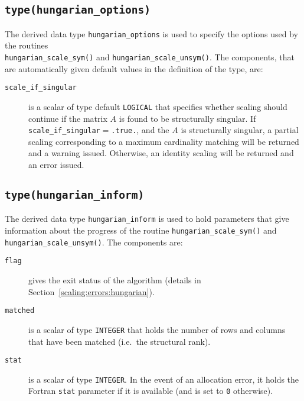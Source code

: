 \subsection{\texttt{type(hungarian\_options)}} \label{scaling:type:hungarian_options}

The derived data type \texttt{hungarian\_options} is used to specify the
options used by the routines \\\texttt{hungarian\_scale\_sym()} and \texttt{hungarian\_scale\_unsym()}. The components,
that are automatically given default values in the definition of the type, are:

\begin{description}

\item[\texttt{scale\_if\_singular}] is a scalar of type default \texttt{LOGICAL}
that specifies whether scaling should continue if the matrix $A$ is found to be
structurally singular. If \texttt{scale\_if\_singular}$=$\texttt{.true.},
and the $A$ is structurally singular, a partial scaling corresponding to a
maximum cardinality matching will be returned and a warning issued. Otherwise,
an identity scaling will be returned and an error issued.

\end{description}

\subsection{\texttt{type(hungarian\_inform)}} \label{scaling:type:hungarian_inform}

The derived data type \texttt{hungarian\_inform} is used to hold parameters
that give information about the progress of the routine
\texttt{hungarian\_scale\_sym()} and \texttt{hungarian\_scale\_unsym()}. The components are:

\begin{description}

\item[\texttt{flag}] gives the exit status of the algorithm (details in Section~\ref{scaling:errors:hungarian}).

\item[\texttt{matched}] is a scalar of type \texttt{INTEGER} that holds the number of rows and columns that have been matched (i.e.~the structural rank).

\item[\texttt{stat}] is a scalar of type \texttt{INTEGER}. In the event of an allocation error, it holds the Fortran \texttt{stat} parameter if it is available (and is set to \texttt{0} otherwise).
\end{description}

